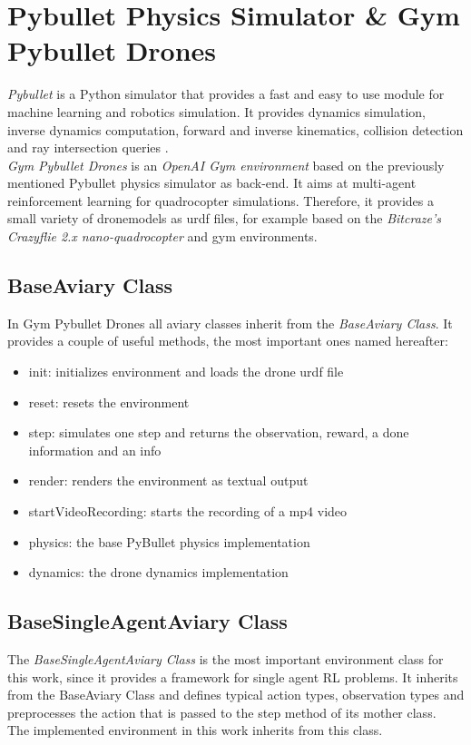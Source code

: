 \newpage

\section{Pybullet Physics Simulator \& Gym Pybullet Drones}
\emph{Pybullet}  is a Python simulator that provides a fast and easy to use module for machine learning and robotics simulation. 
It provides dynamics simulation, inverse dynamics computation, forward and inverse kinematics, collision detection and ray intersection queries \cite{coumans2021}. \\
\emph{Gym Pybullet Drones} \cite{panerati2021learning} is an \emph{OpenAI Gym environment} based on the previously mentioned Pybullet physics simulator as back-end. 
It aims at multi-agent reinforcement learning for quadrocopter simulations. 
Therefore, it provides a small variety of dronemodels as urdf files, for example based on the \emph{Bitcraze's Crazyflie 2.x nano-quadrocopter} and gym environments.\\

\subsection{BaseAviary Class}
In Gym Pybullet Drones all aviary classes inherit from the \emph{BaseAviary Class}. It provides a couple of useful methods, the most important ones named hereafter:
\begin{itemize}
	\item init: initializes environment and loads the drone urdf file
	\item reset: resets the environment
	\item step: simulates one step and returns the observation, reward, a done information and an info
	\item render: renders the environment as textual output
	\item startVideoRecording: starts the recording of a mp4 video
	\item physics: the base PyBullet physics implementation
	\item dynamics: the drone dynamics implementation
\end{itemize}

\subsection{BaseSingleAgentAviary Class}
The \emph{BaseSingleAgentAviary Class} is the most important environment class for this work, since it provides a framework for single agent RL problems. 
It inherits from the BaseAviary Class and defines typical action types, observation types and preprocesses the action that is passed to the step method of its mother class.\\
The implemented environment in this work inherits from this class.
